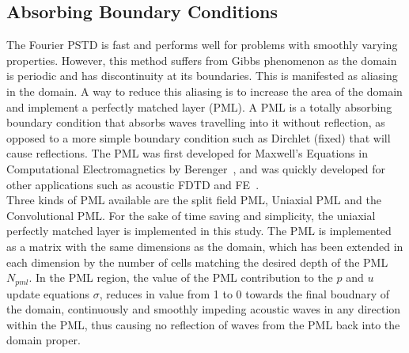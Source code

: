 \subsection{Absorbing Boundary Conditions}
The Fourier PSTD is fast and performs well for problems with smoothly varying properties. However, this method suffers from Gibbs phenomenon as the domain is periodic and has discontinuity at its boundaries. This is manifested as aliasing in the domain. A way to reduce this aliasing is to increase the area of the domain and implement a perfectly matched layer (PML). A PML is a totally absorbing boundary condition that absorbs waves travelling into it without reflection, as opposed to a more simple boundary condition such as Dirchlet (fixed) that will cause reflections. The PML was first developed for Maxwell's Equations in Computational Electromagnetics by Berenger~\cite{Berenger1994}, and was quickly developed for other applications such as acoustic FDTD and FE~\cite{Liu1997}.\\

Three kinds of PML available are the split field PML, Uniaxial PML and the Convolutional PML. For the sake of time saving and simplicity, the uniaxial perfectly matched layer is implemented in this study. The PML is implemented as a matrix with the same dimensions as the domain, which has been extended in each dimension by the number of cells matching the desired depth of the PML $N_{pml}$. In the PML region, the value of the PML contribution to the $p$ and $u$ update equations $\sigma$, reduces in value from 1 to 0 towards the final boudnary of the domain, continuously and smoothly impeding acoustic waves in any direction within the PML, thus causing no reflection of waves from the PML back into the domain proper.\\

